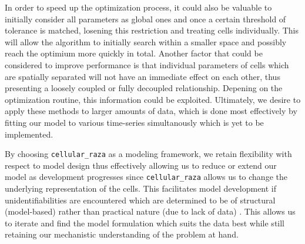 In order to speed up the optimization process, it could also be valuable to initially
consider all
parameters as global ones and once a certain threshold of tolerance is matched, losening this
restriction and treating cells individually.
This will allow the algorithm to initially search within a smaller space and possibly reach the
optimium more quickly in total.
Another factor that could be considered to improve performance is that individual parameters of
cells which are spatially separated will not have an immediate effect on each other,
thus presenting
a loosely coupled or fully decoupled relationship.
Depening on the optimization routine, this information could be exploited.
Ultimately, we desire to apply these methods to larger amounts of data, which is done most
effectively by fitting our model to various time-series simultanously which is yet to be
implemented.

By choosing \texttt{cellular\_raza} \cite{Pleyer2025} as a modeling framework, we
retain flexibility
with respect to model design thus effectively allowing us to reduce or extend our model as
development progresses since \texttt{cellular\_raza} allows us to change the underlying
representation of the cells.
This facilitates model development if unidentifiabilities are encountered which are
determined to be
of structural (model-based) rather than practical nature (due to lack of data)
\cite{Heinrich2025}.
This allows us to iterate and find the model formulation which suits the data best while still
retaining our mechanistic understanding of the problem at hand.


